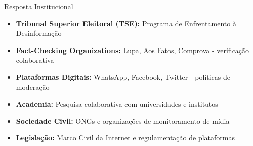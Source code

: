 \documentclass[aspectratio=169,xcolor=table]{beamer}
\begin{document}
\begin{frame}{Resposta Institucional}
    \begin{itemize}
        \item \textbf{Tribunal Superior Eleitoral (TSE):} Programa de Enfrentamento à Desinformação
        \item \textbf{Fact-Checking Organizations:} Lupa, Aos Fatos, Comprova - verificação colaborativa
        \item \textbf{Plataformas Digitais:} WhatsApp, Facebook, Twitter - políticas de moderação
        \item \textbf{Academia:} Pesquisa colaborativa com universidades e institutos
        \item \textbf{Sociedade Civil:} ONGs e organizações de monitoramento de mídia
        \item \textbf{Legislação:} Marco Civil da Internet e regulamentação de plataformas
    \end{itemize}
\end{frame}
\end{document}

